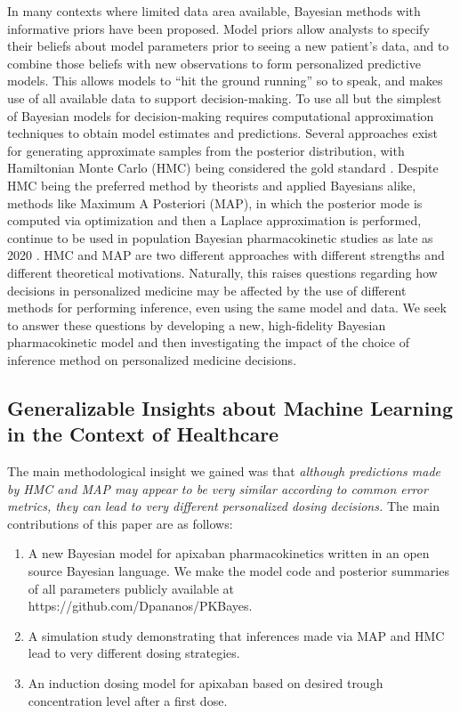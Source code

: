 In many contexts where limited data area available, Bayesian methods with informative priors have been proposed.  Model priors allow analysts to specify their beliefs about model parameters prior to seeing a new patient's data, and to combine those beliefs with new observations to form personalized predictive models.  This allows models to ``hit the ground running'' so to speak, and makes use of all available data to support decision-making.  To use all but the simplest of Bayesian models for decision-making requires computational approximation techniques to obtain model estimates and predictions. Several approaches exist for generating approximate samples from the posterior distribution, with Hamiltonian Monte Carlo (HMC) being considered the gold standard \cite{Neal1996-vn, Matthew_D_Hoffman2014-in, Carpenter2017-qf, Tripuraneni2017-oh}. Despite HMC being the preferred method by theorists and applied Bayesians alike, methods like Maximum A Posteriori (MAP), in which the posterior mode is computed via optimization and then a Laplace approximation is performed, continue to be used in population Bayesian pharmacokinetic studies as late as 2020 \cite{Brooks2016-li, Nguyen2016-pg,  Preijers2019-kc,Stifft2020-uq}. HMC and MAP are two different approaches with different strengths and different theoretical motivations. Naturally, this raises questions regarding how decisions in personalized medicine may be affected by the use of different methods for performing inference, even using the same model and data. We seek to answer these questions by developing a new, high-fidelity Bayesian pharmacokinetic model and then investigating the impact of the choice of inference method on personalized medicine decisions. 

\subsection*{Generalizable Insights about Machine Learning in the Context of Healthcare}

The main methodological insight we gained was that \textit{although predictions made by HMC and MAP may appear to be very similar according to common error metrics, they can lead to very different personalized dosing decisions.} The main contributions of this paper are as follows: 

\begin{enumerate}
\item A new Bayesian model for apixaban pharmacokinetics written in an open source Bayesian language.  We make the model code and posterior summaries of all parameters publicly available at https://github.com/Dpananos/PKBayes.

\item A simulation study demonstrating that inferences made via MAP and HMC lead to very different dosing strategies.

\item An induction dosing model for apixaban based on desired trough concentration level after a first dose.
\end{enumerate}




